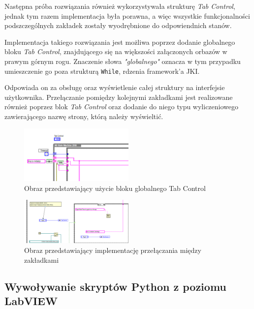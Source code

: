\documentclass{report}
\begin{document}
Następna próba rozwiązania również wykorzystywała strukturę \textit{Tab Control}, jednak tym razem implementacja była porawna, a więc wszystkie funkcjonalności podszczególnych zakładek zostały wyodrębnione do odpowiendnich stanów. 

Implementacja takiego rozwiązania jest możliwa poprzez dodanie globalnego bloku \textit{Tab Control}, znajdującego się na większości załączonych orbazów w prawym górnym rogu. Znaczenie słowa \textit{"globalnego"} oznacza w tym przypadku umieszczenie go poza strukturą \texttt{While}, rdzenia framework'a JKI.

Odpowiada on za obsługę oraz wyświetlenie całej struktury na interfejsie użytkownika. Przełączanie pomiędzy kolejnymi zakładkami jest realizowane również poprzez blok \textit{Tab Control} oraz dodanie do niego typu wyliczeniowego zawierającego nazwę strony, którą należy wyświeltić. 

\begin{figure}[H]
    \centering
    \includegraphics[width=0.5\textwidth]{src/tab-control.png}
    \caption{Obraz przedstawiający użycie bloku globalnego Tab Control}
    \label{fig:tab-control}
\end{figure}

\begin{figure}[H]
    \centering
    \includegraphics[width=0.5\textwidth]{src/tab-control-page.png}
    \caption{Obraz przedstawiający implementację przełączania między zakładkami}
    \label{fig:tab-control-page}
\end{figure}

\subsection{\Large Wywoływanie skryptów Python z poziomu LabVIEW}

%
%
\end{document}
